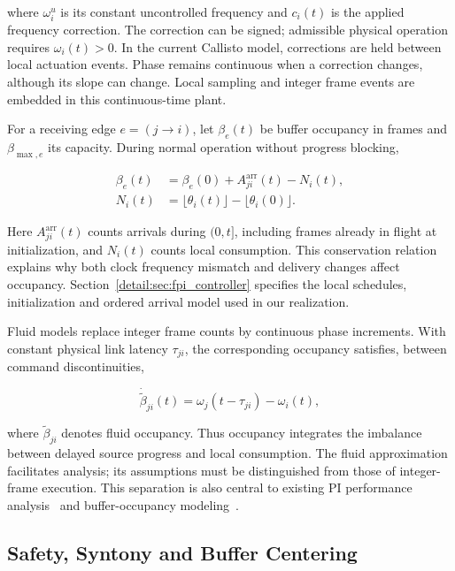 where $\omega_i^u$ is its constant uncontrolled frequency and $c_i(t)$ is the applied frequency correction. The correction can be signed; admissible physical operation requires $\omega_i(t)>0$. In the current Callisto model, corrections are held between local actuation events. Phase remains continuous when a correction changes, although its slope can change. Local sampling and integer frame events are embedded in this continuous-time plant.

For a receiving edge $e=(j\to i)$, let $\beta_e(t)$ be buffer occupancy in frames and $\beta_{\max,e}$ its capacity. During normal operation without progress blocking,

\begin{align}
\beta_e(t)&=\beta_e(0)+A_{ji}^{\mathrm{arr}}(t)-N_i(t),\nonumber\\
N_i(t)&=\lfloor\theta_i(t)\rfloor-\lfloor\theta_i(0)\rfloor.
\label{detail:eq:bg_count_balance}
\end{align}

Here $A_{ji}^{\mathrm{arr}}(t)$ counts arrivals during $(0,t]$, including frames already in flight at initialization, and $N_i(t)$ counts local consumption. This conservation relation explains why both clock frequency mismatch and delivery changes affect occupancy. Section~\ref{detail:sec:fpi_controller} specifies the local schedules, initialization and ordered arrival model used in our realization.

Fluid models replace integer frame counts by continuous phase increments. With constant physical link latency $\tau_{ji}$, the corresponding occupancy satisfies, between command discontinuities,

\begin{equation}
\dot{\widetilde\beta}_{ji}(t)
=\omega_j(t-\tau_{ji})-\omega_i(t),
\end{equation}

where $\widetilde\beta_{ji}$ denotes fluid occupancy. Thus occupancy integrates the imbalance between delayed source progress and local consumption. The fluid approximation facilitates analysis; its assumptions must be distinguished from those of integer-frame execution. This separation is also central to existing PI performance analysis~\cite{lall2022resistance} and buffer-occupancy modeling~\cite{lall2024bufferOccupancy}.

\subsection{Safety, Syntony and Buffer Centering}

